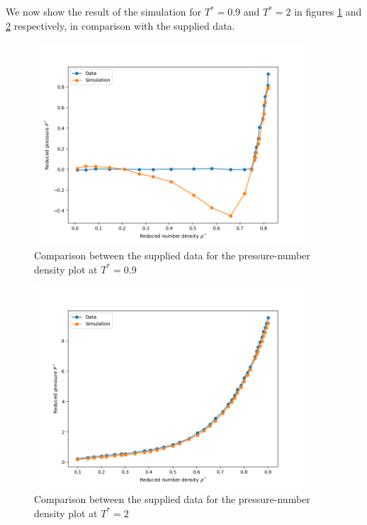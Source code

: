 We now show the result of the simulation for $T^* = 0.9$ and $T^* = 2$ in figures \ref{ex8:t_comparison_09} and \ref{ex8:t_comparison_2} respectively, in comparison with the supplied data.

\begin{figure}[H]
    \centering
    \includegraphics[width=0.9\textwidth]{FIG/ex8/pressure_numdensity_comparison_T09.png}
    \caption{Comparison between the supplied data for the pressure-number density plot at $T^* = 0.9$}
    \label{ex8:t_comparison_09}
\end{figure}

\begin{figure}[H]
    \centering
    \includegraphics[width=0.9\textwidth]{FIG/ex8/pressure_numdensity_comparison_T2.png}
    \caption{Comparison between the supplied data for the pressure-number density plot at $T^* = 2$}
    \label{ex8:t_comparison_2}
\end{figure}

